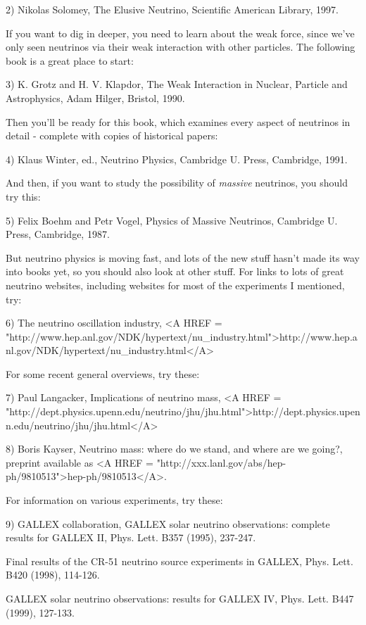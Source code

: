 2) Nikolas Solomey, The Elusive Neutrino, Scientific American Library,
1997.

If you want to dig in deeper, you need to learn about the weak force, 
since we've only seen neutrinos via their weak interaction with other
particles.  The following book is a great place to start:

3) K. Grotz and H. V. Klapdor, The Weak Interaction in Nuclear, Particle
and Astrophysics, Adam Hilger, Bristol, 1990.

Then you'll be ready for this book, which examines every aspect of
neutrinos in detail - complete with copies of historical papers:

4) Klaus Winter, ed., Neutrino Physics, Cambridge U. Press, Cambridge,
1991.

And then, if you want to study the possibility of \emph{massive} neutrinos,
you should try this:

5) Felix Boehm and Petr Vogel, Physics of Massive Neutrinos, Cambridge 
U. Press, Cambridge, 1987.

But neutrino physics is moving fast, and lots of the new stuff hasn't
made its way into books yet, so you should also look at other stuff.
For links to lots of great neutrino websites, including websites for 
most of the experiments I mentioned, try:

6) The neutrino oscillation industry,  
<A HREF = "http://www.hep.anl.gov/NDK/hypertext/nu_industry.html">http://www.hep.anl.gov/NDK/hypertext/nu_industry.html</A>

For some recent general overviews, try these:

7) Paul Langacker, Implications of neutrino mass, 
<A HREF = "http://dept.physics.upenn.edu/neutrino/jhu/jhu.html">http://dept.physics.upenn.edu/neutrino/jhu/jhu.html</A>

8) Boris Kayser, Neutrino mass: where do we stand, and where are we 
going?, preprint available as 
<A HREF = "http://xxx.lanl.gov/abs/hep-ph/9810513">hep-ph/9810513</A>.

For information on various experiments, try these:

9) GALLEX collaboration, GALLEX solar neutrino observations: complete 
results for GALLEX II, Phys. Lett. B357 (1995), 237-247.

Final results of the CR-51 neutrino source experiments in GALLEX,
Phys. Lett. B420 (1998), 114-126.

GALLEX solar neutrino observations: results for GALLEX IV, Phys.
Lett. B447 (1999), 127-133.

